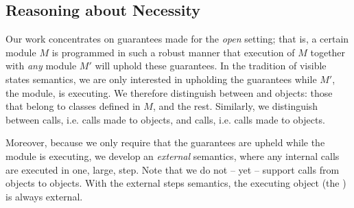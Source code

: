 \renewcommand{\sophia}[2][]{\ponders{Sophia}{blue}{#1} \textcolor{blue}{#2}\xspace}
\renewcommand{\sophia}[2][]{{}}



\subsection{Reasoning about Necessity}
\label{s:approach}

Our work concentrates on guarantees made for the \emph{open} setting; that is, a certain module
$M$ is programmed in such a robust manner
 that execution of $M$ together with \emph{any} \externalM 
module $M'$ will uphold these guarantees. In the tradition of
visible states semantics, we are  only interested in upholding the guarantees while 
$M'$, the  \externalM module,  is executing.   
 We therefore distinguish between \emph{\internalO} and
\emph{\externalO} objects: those that belong to classes defined in $M$, and the rest. Similarly, we 
distinguish between \emph{\internalC} calls, i.e. calls made %
 to \internalO objects, and \emph{\externalC} calls, i.e. calls made %
 to \externalC objects. %


Moreover, because we only require that the guarantees are upheld while 
  the  \externalM module  is executing, we develop an \emph{external } semantics, \sophia{I like the term} where
 any internal calls are executed in one, large, step.
 Note that we do not -- yet -- support calls from
\internalO objects to \externalO objects.\sophia[we need to think where our system forbids that, ... ?]{} 
 With the external steps semantics,  the executing object (the ) is always   external. 
 

